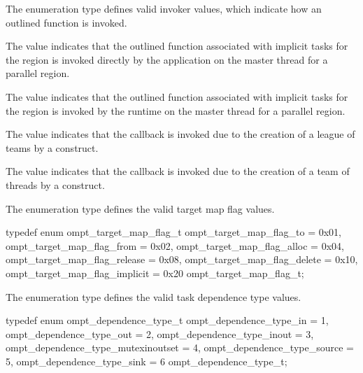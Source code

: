 \descr
The  enumeration type defines valid invoker values,
which indicate how an outlined function is invoked. 

The value  indicates that the outlined 
function associated with implicit tasks for the region is invoked directly 
by the application on the master thread for a parallel region.

The value  indicates that the outlined 
function associated with implicit tasks for the region is invoked by the 
runtime on the master thread for a parallel region.

The value  indicates that the callback is invoked
due to the creation of a league of teams by a  construct.

The value  indicates that the callback is invoked
due to the creation of a team of threads by a  construct.



\label{sec:ompt_target_map_flag_t}

\summary
The  enumeration type defines the valid target 
map flag values.

\format
\begin{ccppspecific}
\begin{omptEnum}
typedef enum ompt_target_map_flag_t {
  ompt_target_map_flag_to             = 0x01,
  ompt_target_map_flag_from           = 0x02,
  ompt_target_map_flag_alloc          = 0x04,
  ompt_target_map_flag_release        = 0x08,
  ompt_target_map_flag_delete         = 0x10,
  ompt_target_map_flag_implicit       = 0x20
} ompt_target_map_flag_t;
\end{omptEnum}
\end{ccppspecific}



\label{sec:ompt_dependence_type_t}

\summary
The  enumeration type defines the valid task dependence 
type values.

\format
\begin{ccppspecific}
\begin{omptEnum}
typedef enum ompt_dependence_type_t {
  ompt_dependence_type_in              = 1,
  ompt_dependence_type_out             = 2,
  ompt_dependence_type_inout           = 3,
  ompt_dependence_type_mutexinoutset   = 4,
  ompt_dependence_type_source          = 5,
  ompt_dependence_type_sink            = 6
} ompt_dependence_type_t;
\end{omptEnum}
\end{ccppspecific}




